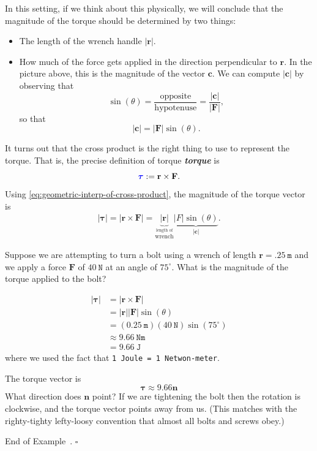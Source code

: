 \documentclass[10pt]{article}
\DeclareRobustCommand{\demph}[1]{%
  \ifmmode
  {\color{Blue}#1}%
  \else
  {\color{Blue}\bfseries\slshape #1}%
  \fi
}
\theoremstyle{definition}
\newtheorem{example}[theorem]{Example}
\renewenvironment{example}
{\begin{oldexample}}
  {\par\smallskip\hfill   End of Example~\theexample. $\square$    \par\end{oldexample}}
\newcommand{\1}[1]{\textbf{1}_{\left[#1\right]}} %
\begin{document}
In this setting, if we think about this physically, we will conclude that the magnitude of the torque
should be determined by two things:
\begin{itemize}
  \item The length of the wrench handle $|\mathbf{r}|$. 
  \item How much of the force gets applied in the direction perpendicular to
  $\mathbf{r}$. In the picture above, this is the magnitude of the vector
  $\mathbf{c}$. We can compute $|\mathbf{c}|$ by observing that
  \begin{equation*}
    \sin(\theta) = \frac{\text{opposite}}{\text{hypotenuse}}=\frac{|\mathbf{c}|}{|\mathbf{F}|},
  \end{equation*}
  so that
  \begin{equation*}
    |\mathbf{c}| = |\mathbf{F}|\sin(\theta).
  \end{equation*}
\end{itemize}
It turns out that the cross product is the right thing to use to represent the
torque. That is, the precise definition of \demph{torque} is 
\begin{equation*}
  \demph{\boldsymbol{\tau}} := \mathbf{r}\times \mathbf{F}.
\end{equation*}
Using \cref{eq:geometric-interp-of-cross-product}, the magnitude of the torque
vector is
\begin{align*}
  |\boldsymbol{\tau}| 
  =|\mathbf{r}\times \mathbf{F}|
  =\underbrace{|\mathbf{r}|}_{\overset{\text{length of}}{\text{wrench}}} \underbrace{|F| \sin(\theta)}_{|\mathbf{c}|}.
\end{align*}



\begin{example}[Torque]
  Suppose we are attempting to turn a bolt using a wrench of length
  $\mathbf{r}=.25\ \mathtt{m}$ and we apply a force $\mathbf{F}$ of $40\ \mathtt{N}$ at an angle
  of $75^{\circ}$. What is the magnitude of the torque applied to the bolt?

  \begin{align*}
    |\boldsymbol{\tau}|
    &= |\mathbf{r}\times \mathbf{F}|\\
    &=|\mathbf{r}| |\mathbf{F}| \sin(\theta)\\
    &= (0.25\ \mathtt{m})(40\ \mathtt{N})\sin(75^{\circ})\\ 
    &\approx 9.66 \ \mathtt{Nm}\\
    &=9.66 \ \mathtt{J}
  \end{align*}
  where we used the fact that \texttt{1 Joule = 1 Netwon-meter}.

  The torque vector is
  \begin{equation*}
    \boldsymbol{\tau}\approx  9.66 \mathbf{n}
  \end{equation*}
  What direction does $\mathbf{n}$ point? If we are tightening the bolt then the
  rotation is clockwise, and the torque vector points away from us. (This matches
  with the righty-tighty lefty-loosy convention that almost all bolts and screws
  obey.)
\end{example}
\end{document}

